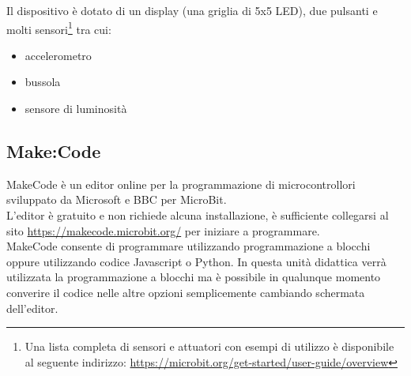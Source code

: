 \documentclass[../../docenti.tex]{subfiles}
\begin{document}
Il dispositivo è dotato di un display (una griglia di 5x5 LED), due pulsanti e molti sensori\footnote{Una lista completa di sensori e attuatori con esempi di utilizzo è disponibile al seguente indirizzo: \url{https://microbit.org/get-started/user-guide/overview}} tra cui:
\begin{itemize}
	\item accelerometro
	\item bussola
	\item sensore di luminosità
\end{itemize}

\subsection{Make:Code}
MakeCode è un editor online per la programmazione di microcontrollori sviluppato da Microsoft e BBC per MicroBit.\\
L'editor è gratuito e non richiede alcuna installazione, è sufficiente collegarsi al sito \url{https://makecode.microbit.org/} per iniziare a programmare.\\

MakeCode consente di programmare utilizzando programmazione a blocchi oppure utilizzando codice Javascript o Python. In questa unità didattica verrà utilizzata la programmazione a blocchi ma è possibile in qualunque momento converire il codice nelle altre opzioni semplicemente cambiando schermata dell'editor.
\end{document}
